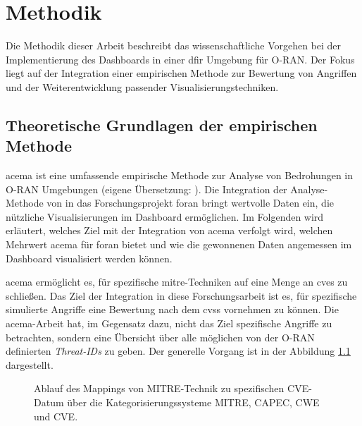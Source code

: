\chapter{Methodik}
\label{chap:methodik}
Die Methodik dieser Arbeit beschreibt das wissenschaftliche Vorgehen bei der Implementierung des Dashboards in einer \gls{dfir} Umgebung für O-RAN. Der Fokus liegt auf der Integration einer empirischen Methode zur Bewertung von Angriffen und der Weiterentwicklung passender Visualisierungstechniken.
\section{Theoretische Grundlagen der empirischen Methode}
\label{sec:auswahlDerEmpirischenMethode}
\gls{acema} ist \glqq{}eine umfassende empirische Methode zur Analyse von Bedrohungen in O-RAN Umgebungen\grqq{} (eigene Übersetzung: \autocite{klementSecuring6GTransition2024}). Die Integration der Analyse-Methode von \citeauthor{klementSecuring6GTransition2024} in das Forschungsprojekt \gls{foran} bringt wertvolle Daten ein, die nützliche Visualisierungen im Dashboard ermöglichen. Im Folgenden wird erläutert, welches Ziel mit der Integration von \gls{acema} verfolgt wird, welchen Mehrwert \gls{acema} für \gls{foran} bietet und wie die gewonnenen Daten angemessen im Dashboard visualisiert werden können.
\par \gls{acema} ermöglicht es, für spezifische \gls{mitre}-Techniken auf eine Menge an \glspl{cve} zu schließen. Das Ziel der Integration in diese Forschungsarbeit ist es, für spezifische simulierte Angriffe eine Bewertung nach dem \gls{cvss} vornehmen zu können. Die \gls{acema}-Arbeit hat, im Gegensatz dazu, nicht das Ziel spezifische Angriffe zu betrachten, sondern eine Übersicht über alle möglichen von der O-RAN definierten \textit{Threat-IDs} zu geben. Der generelle Vorgang ist in der Abbildung \ref{fig:mitre_mapping} dargestellt.

%
\begin{figure}
    \centering
    \caption{Ablauf des Mappings von MITRE-Technik zu spezifischen CVE-Datum über die Kategorisierungssysteme MITRE, CAPEC, CWE und CVE.}
    \label{fig:mitre_mapping}
\end{figure}

